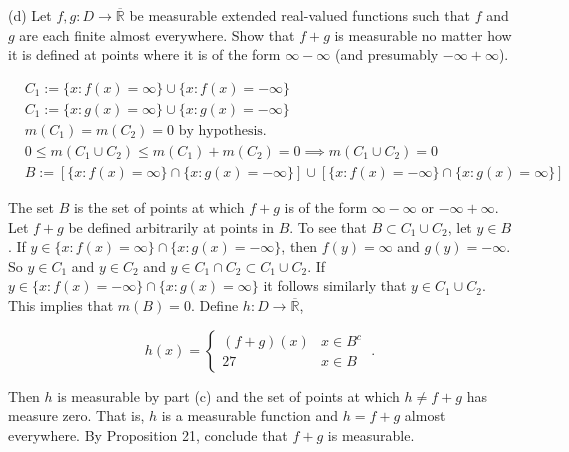 \documentclass[a4paper]{article}
\begin{document}
(d) Let $f,g : D\rightarrow \overline{\mathbb{R}}$ be measurable extended real-valued functions such that $f$ and $g$ are each finite almost everywhere. Show that $f+g$ is measurable no matter how it is defined at points where it is of the form $\infty - \infty$ (and presumably $-\infty + \infty$).

\begin{align*}
&C_1 := \{x : f(x) = \infty\}\cup \{x : f(x) = -\infty\}\\
&C_1 := \{x : g(x) = \infty\}\cup \{x : g(x) = -\infty\}\\
&m(C_1) = m(C_2) = 0 \text{ by hypothesis.}\\
& 0\leq m(C_1\cup C_2) \leq m(C_1) + m(C_2) = 0 \implies m(C_1\cup C_2) = 0\\
& B:= [\{x : f(x) = \infty\} \cap \{x : g(x) = -\infty\}]\cup [\{x : f(x) = -\infty\} \cap \{x : g(x) = \infty\}]
\end{align*}

The set $B$ is the set of points at which $f+g$ is of the form $\infty - \infty$ or $-\infty + \infty$. Let $f+g$ be defined arbitrarily at points in $B$. To see that $B\subset C_1 \cup C_2$, let $y \in B$. If $y \in  \{x : f(x) = \infty\} \cap \{x : g(x) = -\infty\}$, then $f(y) = \infty$ and $g(y) = -\infty$. So $y \in C_1$ and $y \in C_2$ and $y \in C_1\cap C_2 \subset C_1 \cup C_2$. If $y \in \{x : f(x) = -\infty\} \cap \{x : g(x) = \infty\}$ it follows similarly that $y \in C_1 \cup C_2$. This implies that $m(B) = 0$. Define $h : D \rightarrow \overline{\mathbb{R}}$,

$$h(x) = \begin{cases}
(f+g)(x) & x \in B^c\\
27 & x \in B \end{cases} \;. $$

Then $h$ is measurable by part (c) and the set of points at which $h \neq f+g$ has measure zero. That is, $h$ is a measurable function and $h = f+g$ almost everywhere. By Proposition 21, conclude that $f+g$ is measurable. 
\end{document}
